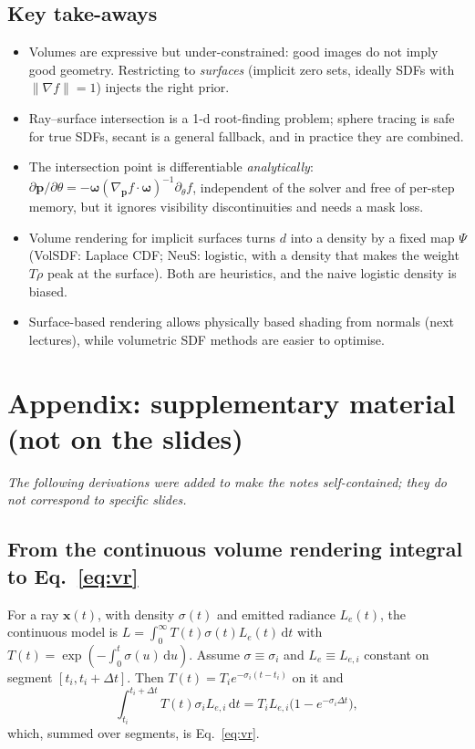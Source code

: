 \documentclass[11pt,a4paper]{article}
\newcommand{\bx}{{\bm{x}}}
\newcommand{\bp}{{\bm{p}}}
\newcommand{\bom}{{\bm{\omega}}}
\begin{document}
\subsection*{Key take-aways}
\begin{itemize}
\item Volumes are expressive but under-constrained: good images do not imply good geometry. Restricting to \emph{surfaces} (implicit zero sets, ideally SDFs with $\|\nabla f\|=1$) injects the right prior.
\item Ray--surface intersection is a 1-d root-finding problem; sphere tracing is safe for true SDFs, secant is a general fallback, and in practice they are combined.
\item The intersection point is differentiable \emph{analytically}: $\partial\bp/\partial\theta=-\bom(\nabla_{\bp} f\cdot\bom)^{-1}\partial_\theta f$, independent of the solver and free of per-step memory, but it ignores visibility discontinuities and needs a mask loss.
\item Volume rendering for implicit surfaces turns $d$ into a density by a fixed map $\Psi$ (VolSDF: Laplace CDF; NeuS: logistic, with a density that makes the weight $T\rho$ peak at the surface). Both are heuristics, and the naive logistic density is biased.
\item Surface-based rendering allows physically based shading from normals (next lectures), while volumetric SDF methods are easier to optimise.
\end{itemize}

\appendix
\section{Appendix: supplementary material (not on the slides)}
\emph{The following derivations were added to make the notes self-contained; they do not correspond to specific slides.}

\subsection{From the continuous volume rendering integral to Eq.~\texorpdfstring{\eqref{eq:vr}}{(1)}}
For a ray $\bx(t)$, with density $\sigma(t)$ and emitted radiance $L_e(t)$, the continuous model is
$L=\int_0^\infty T(t)\sigma(t)L_e(t)\,\mathrm dt$ with $T(t)=\exp(-\int_0^t\sigma(u)\,\mathrm du)$.
Assume $\sigma\equiv\sigma_i$ and $L_e\equiv L_{e,i}$ constant on segment $[t_i,t_i+\Delta t]$. Then $T(t)=T_i e^{-\sigma_i(t-t_i)}$ on it and
\[
\int_{t_i}^{t_i+\Delta t}T(t)\sigma_iL_{e,i}\,\mathrm dt=T_iL_{e,i}\bigl(1-e^{-\sigma_i\Delta t}\bigr),
\]
which, summed over segments, is Eq.~\eqref{eq:vr}.
\end{document}
